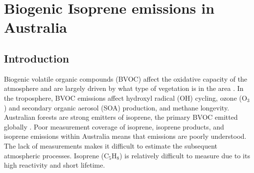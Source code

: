 
%
%



\chapter{Biogenic Isoprene emissions in Australia} %
\label{BioIsop}
  
\section{Introduction}  
\label{BioIsop:intro}  
  
  
  
  Biogenic volatile organic compounds (BVOC) affect the oxidative capacity of the atmosphere and are largely driven by what type of vegetation is in the area \parencite{Kefauver2014}.
  In the troposphere, BVOC emissions affect hydroxyl radical (OH) cycling, ozone (O$_3$) and secondary organic aerosol (SOA) production, and methane longevity.
  Australian forests are strong emitters of isoprene, the primary BVOC emitted globally \parencite{Guenther2006,Messina2016}. %
  Poor measurement coverage of isoprene, isoprene products, and isoprene emissions within Australia means that emissions are poorly understood.
  The lack of measurements makes it difficult to estimate the subsequent atmospheric processes. 
  Isoprene (C$_5$H$_8$) is relatively difficult to measure due to its high reactivity and short lifetime.
  
